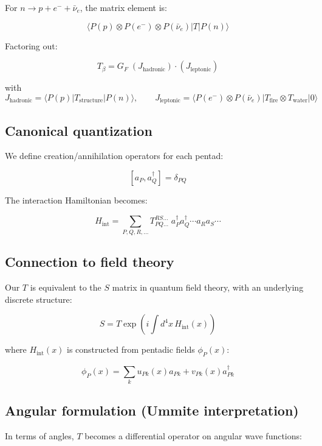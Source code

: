 \documentclass[11pt]{article}
\begin{document}
For \(n \to p + e^- + \bar{\nu}_e\), the matrix element is:

\[
\langle P(p)\otimes P(e^-)\otimes P(\bar{\nu}_e) | T | P(n) \rangle
\]

Factoring out:

\[
T_\beta = G_F \; (J_{\text{hadronic}})\cdot(J_{\text{leptonic}})
\]

with \[
J_{\text{hadronic}} = \langle P(p)| T_{\text{structure}} |P(n)\rangle,\qquad
J_{\text{leptonic}} = \langle P(e^-)\otimes P(\bar{\nu}_e)| T_{\text{fire}}\otimes T_{\text{water}} |0\rangle
\]

\hypertarget{canonical-quantization}{%
\subsection{Canonical quantization}\label{canonical-quantization}}

We define creation/annihilation operators for each pentad:

\[
[ a_P, a_Q^\dagger ] = \delta_{PQ}
\]

The interaction Hamiltonian becomes:

\[
H_{\text{int}} = \sum_{P,Q,R,\dots} T_{PQ\dots}^{RS\dots}\; a_P^\dagger a_Q^\dagger \cdots a_R a_S \cdots
\]

\hypertarget{connection-to-field-theory}{%
\subsection{Connection to field
theory}\label{connection-to-field-theory}}

Our \(T\) is equivalent to the \(S\) matrix in quantum field theory,
with an underlying discrete structure:

\[
S = T \exp\!\left( i\int d^4x\, H_{\text{int}}(x) \right)
\]

where \(H_{\text{int}}(x)\) is constructed from pentadic fields
\(\phi_P(x)\):

\[
\phi_P(x) = \sum_k u_{Pk}(x) a_{Pk} + v_{Pk}(x) a_{Pk}^\dagger
\]

\hypertarget{angular-formulation-ummite-interpretation}{%
\subsection{Angular formulation (Ummite
interpretation)}\label{angular-formulation-ummite-interpretation}}

In terms of angles, \(T\) becomes a differential operator on angular
wave functions:
\end{document}
